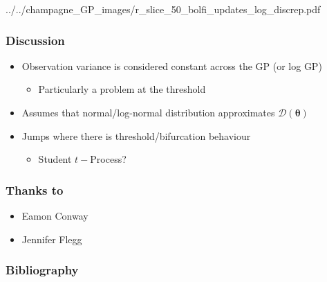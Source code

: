 \documentclass{beamer}
\begin{document}
\begin{frame}
{{            ../../champagne_GP_images/r_slice_50_bolfi_updates_log_discrep.pdf}}
\end{frame}

\begin{frame}
    \frametitle{Discussion}
    \begin{itemize}
        \item Observation variance is considered constant across the GP (or log GP)\begin{itemize}
                  \item Particularly a problem at the threshold
              \end{itemize}
        \item Assumes that normal/log-normal distribution approximates $\mathcal{D}(\bm{\theta})$
        \item Jumps where there is threshold/bifurcation behaviour\begin{itemize}
                  \item Student $t-$Process?
              \end{itemize}
    \end{itemize}
\end{frame}

\begin{frame}
    \frametitle{Thanks to}
    \begin{itemize}
        \item Eamon Conway
        \item Jennifer Flegg
    \end{itemize}
\end{frame}

\begin{frame}
    \frametitle{Bibliography}
    \printbibliography
\end{frame}
\end{document}
